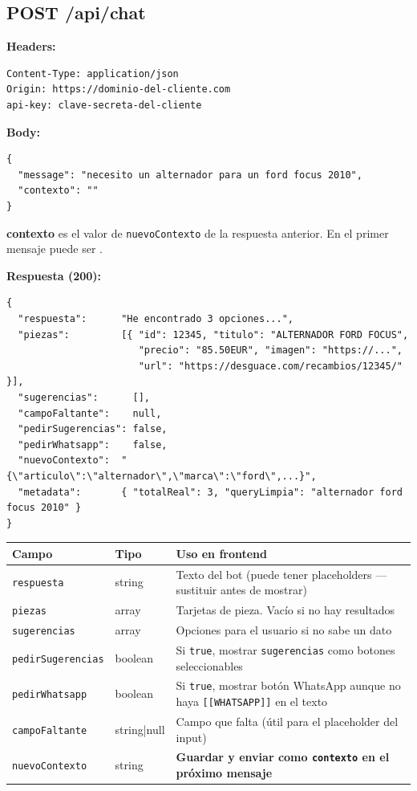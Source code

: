 \documentclass[12pt, a4paper]{article}
\begin{document}
\subsection{POST /api/chat}

\textbf{Headers:}
\begin{lstlisting}[style=bash]
Content-Type: application/json
Origin: https://dominio-del-cliente.com
api-key: clave-secreta-del-cliente
\end{lstlisting}

\textbf{Body:}
\begin{lstlisting}[style=json]
{
  "message": "necesito un alternador para un ford focus 2010",
  "contexto": ""
}
\end{lstlisting}

\begin{tcolorbox}[colback=azulclaro!30, colframe=azulneto, fontupper=\small]
  \textbf{contexto} es el valor de \texttt{nuevoContexto} de la respuesta anterior. En el primer mensaje puede ser \texttt{\textquotedbl\textquotedbl}.
\end{tcolorbox}

\textbf{Respuesta (200):}
\begin{lstlisting}[style=json]
{
  "respuesta":      "He encontrado 3 opciones...",
  "piezas":         [{ "id": 12345, "titulo": "ALTERNADOR FORD FOCUS",
                       "precio": "85.50EUR", "imagen": "https://...",
                       "url": "https://desguace.com/recambios/12345/" }],
  "sugerencias":      [],
  "campoFaltante":    null,
  "pedirSugerencias": false,
  "pedirWhatsapp":    false,
  "nuevoContexto":  "{\"articulo\":\"alternador\",\"marca\":\"ford\",...}",
  "metadata":       { "totalReal": 3, "queryLimpia": "alternador ford focus 2010" }
}
\end{lstlisting}

\begin{center}
\renewcommand{\arraystretch}{1.25}
\begin{tabularx}{\textwidth}{llX}
\toprule
\textbf{Campo} & \textbf{Tipo} & \textbf{Uso en frontend} \\
\midrule
\texttt{respuesta}        & string      & Texto del bot (puede tener placeholders — sustituir antes de mostrar) \\
\texttt{piezas}           & array       & Tarjetas de pieza. Vacío si no hay resultados \\
\texttt{sugerencias}      & array       & Opciones para el usuario si no sabe un dato \\
\texttt{pedirSugerencias} & boolean     & Si \texttt{true}, mostrar \texttt{sugerencias} como botones seleccionables \\
\texttt{pedirWhatsapp}    & boolean     & Si \texttt{true}, mostrar botón WhatsApp aunque no haya \texttt{[[WHATSAPP]]} en el texto \\
\texttt{campoFaltante}    & string|null & Campo que falta (útil para el placeholder del input) \\
\texttt{nuevoContexto}    & string      & \textbf{Guardar y enviar como \texttt{contexto} en el próximo mensaje} \\
\bottomrule
\end{tabularx}
\end{center}
\end{document}
